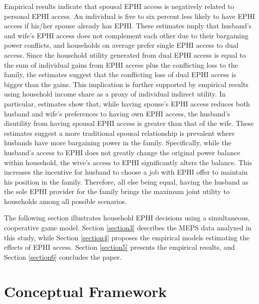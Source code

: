 \documentclass[legno,11pt]{article}
\begin{document}
Empirical results indicate that spousal EPHI access is negatively
related to personal EPHI access. An individual is five
 to six percent less likely to have EPHI access if
 his/her spouse already has EPHI. These estimates imply that
  husband's and wife's EPHI access does not complement each
   other due to their bargaining power conflicts, and
households on average prefer single EPHI access to dual access.
Since the household utility generated from dual EPHI access is equal
to the sum of individual gains from EPHI access plus the conflicting
loss to the family, the estimates suggest that the conflicting loss
of dual EPHI access is bigger than the gains. This implication is
further supported by empirical results using household income share
as a proxy of individual indirect utility. In particular, estimates
show that, while having spouse's EPHI access reduces both husband
and wife's preferences to having own EPHI access, the husband's
disutility from having spousal EPHI access is greater than that of
the wife. These estimates suggest a more traditional spousal
relationship
 is prevalent
where husbands have more bargaining power in the family.
Specifically, while the husband's access to EPHI does not greatly
change the original power balance within household, the wive's
access to EPHI significantly alters the balance. This increases the
incentive for husband to choose a job with EPHI offer to maintain
his position in the family. Therefore, all else being equal, having
the husband as the sole EPHI provider for the family brings the
maximum joint utility to households among all possible scenarios.
\par

The following section illustrates household EPHI decisions using a
simultaneous, cooperative game model. Section \ref{section3}
describes the MEPS data analyzed in this study, while Section
\ref{section4} proposes the empirical models estimating the effects
of EPHI access. Section \ref{section5} presents the empirical
results, and Section \ref{section6} concludes the paper.
\par

\section{Conceptual Framework}\label{section2}
\end{document}
